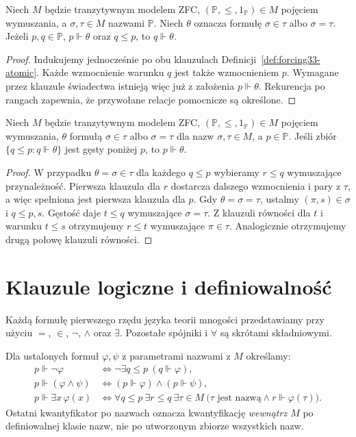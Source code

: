 \begin{lemat}
\label{lem:forcing33-atomic-monotone}
Niech $M$ będzie tranzytywnym modelem ZFC,
$(\mathbb P,\leq,1_{\mathbb P})\in M$
pojęciem wymuszania, a $\sigma,\tau\in M$
nazwami $\mathbb P$. Niech $\theta$
oznacza formułę $\sigma\in\tau$
albo $\sigma=\tau$. Jeżeli
$p,q\in\mathbb P$, $p\Vdash\theta$
oraz $q\leq p$, to $q\Vdash\theta$.
\end{lemat}
\begin{proof}
Indukujemy jednocześnie po obu
klauzulach Definicji~\ref{def:forcing33-atomic}.
Każde wzmocnienie warunku $q$ jest
także wzmocnieniem $p$.
Wymagane przez klauzule świadectwa
istnieją więc już z założenia
$p\Vdash\theta$. Rekurencja po
rangach zapewnia, że przywołane
relacje pomocnicze są określone.
\end{proof}

\begin{lemat}
\label{lem:forcing33-atomic-dense}
Niech $M$ będzie tranzytywnym modelem ZFC,
$(\mathbb P,\leq,1_{\mathbb P})\in M$
pojęciem wymuszania, $\theta$ formułą
$\sigma\in\tau$ albo $\sigma=\tau$
dla nazw $\sigma,\tau\in M$, a
$p\in\mathbb P$. Jeśli zbiór
$\{q\leq p:q\Vdash\theta\}$ jest
gęsty poniżej $p$, to $p\Vdash\theta$.
\end{lemat}
\begin{proof}
W przypadku $\theta=\sigma\in\tau$
dla każdego $q\leq p$ wybieramy
$r\leq q$ wymuszające przynależność.
Pierwsza klauzula dla $r$ dostarcza
dalszego wzmocnienia i pary z $\tau$,
a więc spełniona jest pierwsza
klauzula dla $p$.
Gdy $\theta=\sigma=\tau$, ustalmy
$(\pi,s)\in\sigma$ i $q\leq p,s$.
Gęstość daje $t\leq q$ wymuszające
$\sigma=\tau$. Z klauzuli równości
dla $t$ i warunku $t\leq s$
otrzymujemy $r\leq t$ wymuszające
$\pi\in\tau$. Analogicznie otrzymujemy
drugą połowę klauzuli równości.
\end{proof}

\section{Klauzule logiczne i definiowalność}
Każdą formułę pierwszego rzędu języka
teorii mnogości przedstawiamy przy użyciu
$=$, $\in$, $\neg$, $\land$ oraz $\exists$.
Pozostałe spójniki i $\forall$
są skrótami składniowymi.

\begin{definicja}
\label{def:forcing33-formulas}
Dla ustalonych formuł $\varphi,\psi$
z parametrami nazwami z $M$ określamy:
\[
\begin{aligned}
p\Vdash\neg\varphi
&\iff \neg\exists q\leq p\ (q\Vdash\varphi),\\
p\Vdash(\varphi\land\psi)
&\iff (p\Vdash\varphi)\land(p\Vdash\psi),\\
p\Vdash\exists x\,\varphi(x)
&\iff \forall q\leq p\ \exists r\leq q\
 \exists\tau\in M\
 \bigl(\tau\text{ jest nazwą}\land
                 r\Vdash\varphi(\tau)\bigr).
\end{aligned}
\]
Ostatni kwantyfikator po nazwach
oznacza kwantyfikację \emph{wewnątrz $M$}
po definiowalnej klasie nazw,
nie po utworzonym zbiorze wszystkich nazw.
\end{definicja}

